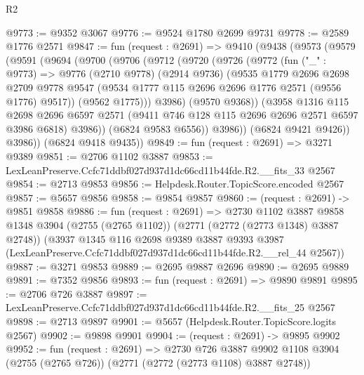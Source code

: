 \begin{lexlean}{R2}
\begin{coremodule}
@9773 := @9352 @3067
@9776 := @9524 @1780 @2699 @9731
@9778 := @2589 @1776 @2571
@9847 := fun (request : @2691) =>
  @9410
    (@9438
      (@9573
        (@9579
          (@9591
            (@9694
              (@9700
                (@9706
                  (@9712
                    (@9720
                      (@9726
                        (@9772
                          (fun ("_" : @9773) =>
                          @9776
                            (@2710 @9778)
                            (@2914 @9736)
                            (@9535
                              @1779
                              @2696
                              @2698
                              @2709
                              @9778
                              @9547
                              (@9534 @1777 @115 @2696 @2696 @1776 @2571 (@9556 @1776) @9517))
                            (@9562 @1775)))
                        @3986)
                      (@9570 @9368))
                    (@3958
                      @1316
                      @115
                      @2698
                      @2696
                      @6597
                      @2571
                      (@9411 @746 @128 @115 @2696 @2696 @2571 @6597 @3986 @6818)
                      @3986))
                  (@6824 @9583 @6556))
                @3986))
            (@6824 @9421 @9426))
          @3986))
      (@6824 @9418 @9435))
@9849 := fun (request : @2691) => @3271 @9389
@9851 := @2706 @1102 @3887
@9853 := LexLeanPreserve.Ccfc71ddbf027d937d1dc66cd11b44fde.R2.__fits_33 @2567
@9854 := @2713 @9853
@9856 := Helpdesk.Router.TopicScore.encoded @2567
@9857 := @5657 @9856
@9858 := @9854 @9857
@9860 := (request : @2691) -> @9851 @9858
@9886 := fun (request : @2691) =>
  @2730
    @1102
    @3887
    @9858
    @1348
    @3904
    (@2755 (@2765 @1102))
    (@2771 (@2772 (@2773 @1348) @3887 @2748))
    (@3937
      @1345
      @116
      @2698
      @9389
      @3887
      @9393
      @3987
      (LexLeanPreserve.Ccfc71ddbf027d937d1dc66cd11b44fde.R2.__rel_44 @2567))
@9887 := @3271 @9853
@9889 := @2695 @9887 @2696
@9890 := @2695 @9889
@9891 := @7352 @9856
@9893 := fun (request : @2691) => @9890 @9891
@9895 := @2706 @726 @3887
@9897 := LexLeanPreserve.Ccfc71ddbf027d937d1dc66cd11b44fde.R2.__fits_25 @2567
@9898 := @2713 @9897
@9901 := @5657 (Helpdesk.Router.TopicScore.logits @2567)
@9902 := @9898 @9901
@9904 := (request : @2691) -> @9895 @9902
@9952 := fun (request : @2691) =>
  @2730
    @726
    @3887
    @9902
    @1108
    @3904
    (@2755 (@2765 @726))
    (@2771 (@2772 (@2773 @1108) @3887 @2748))

\end{coremodule}
\end{lexlean}
